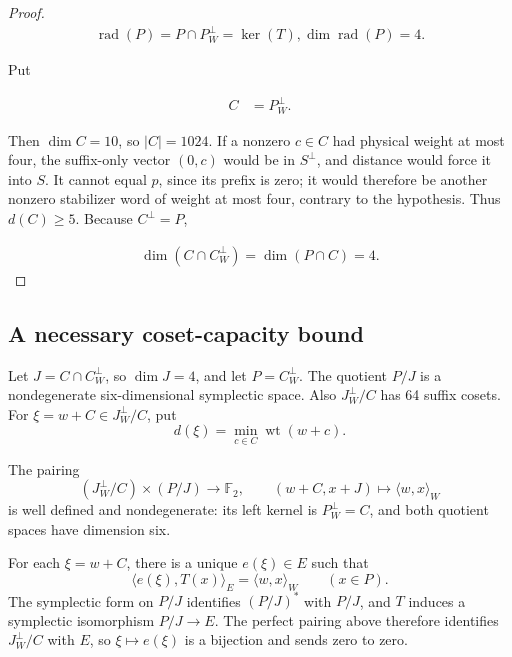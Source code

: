 \documentclass[11pt]{article}
\begin{document}
\begin{proof}
\[
\begin{aligned}
\operatorname{rad}(P)=P \cap P^\perp_{W}=\operatorname{ker}(T),   \dim \operatorname{rad}(P)=4.
\end{aligned}
\]

Put

\[
\begin{aligned}
C &=P^\perp_{W}.
\end{aligned}
\]

Then \(\dim C=10\), so \(\lvert C\rvert=1024\). If a nonzero \(c \in C\) had physical weight at most four, the suffix-only vector \((0,c)\) would be in \(S^\perp\), and distance would force it into \(S\). It cannot equal \(p\), since its prefix is zero; it would therefore be another nonzero stabilizer word of weight at most four, contrary to the hypothesis. Thus \(d(C) \ge 5\). Because \(C^\perp=P\),

\[
\begin{aligned}
\dim(C \cap C^\perp_{W})=\dim(P \cap C)=4.
\end{aligned}
\]

\end{proof}

\subsection{A necessary coset-capacity bound}\label{a-necessary-coset-capacity-bound}

Let \(J=C \cap C^\perp_{W}\), so \(\dim J=4\), and let \(P=C^\perp_{W}\). The quotient \(P/J\) is a nondegenerate six-dimensional symplectic space. Also \(J^\perp_{W}/C\) has 64 suffix cosets. For \(\xi=w+C\in J^\perp_{W}/C\), put
\[
d(\xi)=\min_{c\in C}\operatorname{wt}(w+c).
\]
\begin{minipage}{\linewidth}
The pairing
\[
(J^\perp_{W}/C)\times(P/J)\longrightarrow\mathbb{F}_{2},
\qquad
(w+C,x+J)\longmapsto\langle w,x\rangle_{W}
\]
is well defined and nondegenerate: its left kernel is \(P^\perp_{W}=C\), and both quotient spaces have dimension six.
\end{minipage}

For each \(\xi=w+C\), there is a unique \(e(\xi)\in E\) such that
\[
\langle e(\xi),T(x)\rangle_{E}=\langle w,x\rangle_{W}
\qquad(x\in P).
\]
The symplectic form on \(P/J\) identifies \((P/J)^*\) with \(P/J\), and \(T\) induces a symplectic isomorphism \(P/J\to E\). The perfect pairing above therefore identifies \(J^\perp_{W}/C\) with \(E\), so \(\xi\mapsto e(\xi)\) is a bijection and sends zero to zero.
\end{document}
